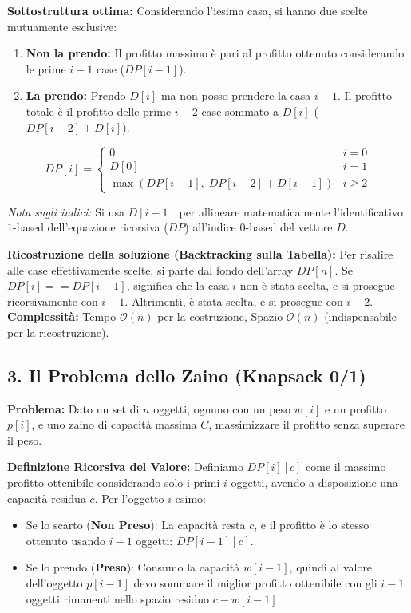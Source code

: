 \documentclass[12pt, a4paper]{article}
\begin{document}
\textbf{Sottostruttura ottima:}
Considerando l'iesima casa, si hanno due scelte mutuamente esclusive:
\begin{enumerate}
\item \textbf{Non la prendo:} Il profitto massimo è pari al profitto ottenuto considerando le prime $i-1$ case ($DP[i-1]$).
\item \textbf{La prendo:} Prendo $D[i]$ ma non posso prendere la casa $i-1$. Il profitto totale è il profitto delle prime $i-2$ case sommato a $D[i]$ ($DP[i-2] + D[i]$).
\end{enumerate}


$$DP[i] = \begin{cases} 0 & i = 0 \\ D[0] & i = 1 \\ \max(DP[i-1], \; DP[i-2] + D[i-1]) & i \ge 2 \end{cases}$$


\textit{Nota sugli indici:} Si usa $D[i-1]$ per allineare matematicamente l'identificativo $1$-based dell'equazione ricorsiva ($DP$) all'indice $0$-based del vettore $D$.

\textbf{Ricostruzione della soluzione (Backtracking sulla Tabella):}
Per risalire alle case effettivamente scelte, si parte dal fondo dell'array $DP[n]$.
Se $DP[i] == DP[i-1]$, significa che la casa $i$ non è stata scelta, e si prosegue ricorsivamente con $i-1$. Altrimenti, è stata scelta, e si prosegue con $i-2$.
\textbf{Complessità:} Tempo $\mathcal{O}(n)$ per la costruzione, Spazio $\mathcal{O}(n)$ (indispensabile per la ricostruzione).

\subsection{3. Il Problema dello Zaino (Knapsack 0/1)}
\textbf{Problema:} Dato un set di $n$ oggetti, ognuno con un peso $w[i]$ e un profitto $p[i]$, e uno zaino di capacità massima $C$, massimizzare il profitto senza superare il peso.

\textbf{Definizione Ricorsiva del Valore:}
Definiamo $DP[i][c]$ come il massimo profitto ottenibile considerando solo i primi $i$ oggetti, avendo a disposizione una capacità residua $c$.
Per l'oggetto $i$-esimo:
\begin{itemize}
\item Se lo scarto (\textbf{Non Preso}): La capacità resta $c$, e il profitto è lo stesso ottenuto usando $i-1$ oggetti: $DP[i-1][c]$.
\item Se lo prendo (\textbf{Preso}): Consumo la capacità $w[i-1]$, quindi al valore dell'oggetto $p[i-1]$ devo sommare il miglior profitto ottenibile con gli $i-1$ oggetti rimanenti nello spazio residuo $c - w[i-1]$.
\end{itemize}
\end{document}
